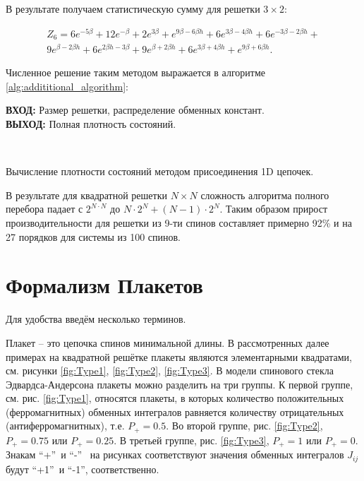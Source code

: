 \documentclass[utf8, babel, sor, jor, amsmath, amssymb, reprint]{elsarticle} %
\begin{document}
В результате получаем статистическую сумму для решетки $3 \times 2$:

\begin{equation}
	\label{eq:stat_3_res}
	\begin{alignedat}{2}
		Z_6 = 6 e^{-5 \beta }+12 e^{-\beta }+2 e^{3 \beta }+e^{9 \beta -6 \beta  h}+6 e^{3 \beta -4 \beta  h}+6 e^{-3 \beta -2 \beta  h}+\\
		9 e^{\beta -2 \beta  h}+6 e^{2 \beta  h-3 \beta }+9 e^{\beta +2 \beta  h}+6 e^{3 \beta +4 \beta  h}+e^{9 \beta +6 \beta  h}.
	\end{alignedat}
\end{equation}

Численное решение таким методом выражается в алгоритме \ref{alg:addititional_algorithm}:


\begin{algorithm}[H]
	\textbf{ВХОД:} Размер решетки, распределение обменных констант.\\
	\textbf{ВЫХОД:} Полная плотность состояний.
	\begin{algorithmic}
		{
			{
			}
			\ENDFOR\\
		}
		\ENDFOR
	\end{algorithmic}
	\caption{Вычисление плотности состояний методом присоединения 1D цепочек.}
	\label{alg:addititional_algorithm}
\end{algorithm}
				
В результате для квадратной решетки $N \times N$ сложность алгоритма полного перебора падает с $2^{N \cdot N}$ до $N \cdot 2^N + (N - 1) \cdot 2^N$. Таким образом прирост производительности для решетки из 9-ти спинов составляет примерно 92\% и на 27 порядков для системы из 100 спинов.


\section{Формализм Плакетов}

Для удобства введём несколько терминов.

 Плакет – это цепочка спинов минимальной длины. В рассмотренных далее примерах на квадратной решётке плакеты являются элементарными квадратами, см. рисунки \ref{fig:Type1}, \ref{fig:Type2}, \ref{fig:Type3}. В модели спинового стекла Эдвардса-Андерсона плакеты можно разделить на три группы. К первой группе, см. рис. \ref{fig:Type1}, относятся плакеты, в которых количество положительных (ферромагнитных) обменных интегралов равняется количеству отрицательных (антиферромагнитных), т.е. $P_+=0.5$. Во второй группе, рис. \ref{fig:Type2}, $P_+=0.75$ или $P_+=0.25$. В третьей группе, рис. \ref{fig:Type3}, $P_+=1$ или $P_+=0$. Знакам \textquotedblleft +\textquotedblright ~и   \textquotedblleft -\textquotedblright ~ на рисунках соответствуют значения обменных интегралов $J_{ij}$ будут \textquotedblleft +1\textquotedblright ~и \textquotedblleft -1\textquotedblright, соответственно.
 
\end{document}
